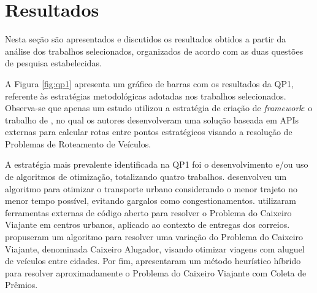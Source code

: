 \section{Resultados}
Nesta seção são apresentados e discutidos os resultados obtidos a partir da análise dos trabalhos selecionados, 
organizados de acordo com as duas questões de pesquisa estabelecidas.

A Figura \ref{fig:qp1} apresenta um gráfico de barras com os resultados da \gls{QP}1, referente às estratégias metodológicas 
adotadas nos trabalhos selecionados. Observa-se que apenas um estudo utilizou a estratégia de criação de \textit{framework}: 
o trabalho de , no qual os autores desenvolveram uma solução baseada em \gls{API}s externas para calcular 
rotas entre pontos estratégicos visando a resolução de Problemas de Roteamento de Veículos. 

A estratégia mais prevalente identificada na \gls{QP}1 foi o desenvolvimento e/ou uso de algoritmos de otimização, 
totalizando quatro trabalhos.  desenvolveu um algoritmo para otimizar o transporte urbano 
considerando o menor trajeto no menor tempo possível, evitando gargalos como congestionamentos. 
 utilizaram ferramentas externas de código aberto para resolver o Problema 
do Caixeiro Viajante em centros urbanos, aplicado ao contexto de entregas dos correios.  
propuseram um algoritmo para resolver uma variação do Problema do Caixeiro Viajante, denominada Caixeiro Alugador, 
visando otimizar viagens com aluguel de veículos entre cidades. Por fim,  apresentaram um 
método heurístico híbrido para resolver aproximadamente o Problema do Caixeiro Viajante com Coleta de Prêmios.

